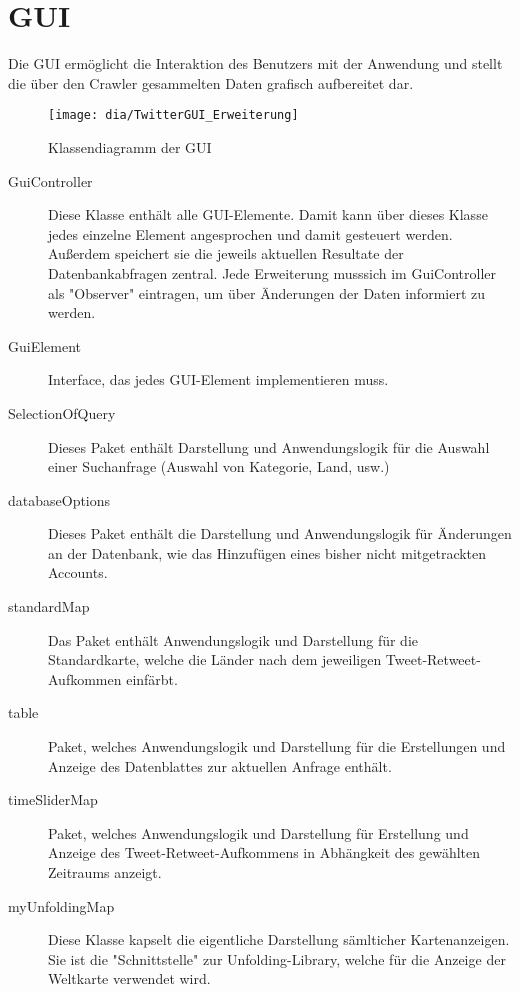 \section{GUI}
Die GUI ermöglicht die Interaktion des Benutzers mit der Anwendung und stellt die über den Crawler gesammelten Daten grafisch aufbereitet dar. 
\begin{figure}[h!]
	\centering
	\texttt{[image: dia/TwitterGUI\_Erweiterung]}
	\caption{Klassendiagramm der GUI}
	\label{fig:GUI}
\end{figure}
\begin{description}
	\item[GuiController] Diese Klasse enthält alle GUI-Elemente. Damit kann über dieses Klasse jedes einzelne Element angesprochen und damit gesteuert werden. Außerdem speichert sie die jeweils aktuellen Resultate der Datenbankabfragen zentral. Jede Erweiterung musssich im GuiController als "Observer" eintragen, um über Änderungen der Daten informiert zu werden. 
	\item[GuiElement] Interface, das jedes GUI-Element implementieren muss.
	\item [SelectionOfQuery] Dieses Paket enthält Darstellung und Anwendungslogik für die Auswahl einer Suchanfrage (Auswahl von Kategorie, Land, usw.)
	\item[databaseOptions] Dieses Paket enthält die Darstellung und Anwendungslogik für Änderungen an der Datenbank, wie das Hinzufügen eines bisher nicht mitgetrackten Accounts.
	
	\item [standardMap] Das Paket enthält Anwendungslogik und Darstellung für die Standardkarte, welche die Länder nach dem jeweiligen Tweet-Retweet-Aufkommen einfärbt.
	\item [table] Paket, welches Anwendungslogik und Darstellung für die Erstellungen und Anzeige des Datenblattes zur aktuellen Anfrage enthält.
	\item [timeSliderMap] Paket, welches Anwendungslogik und Darstellung für Erstellung und Anzeige des Tweet-Retweet-Aufkommens in Abhängkeit des gewählten Zeitraums anzeigt.
	\item [myUnfoldingMap] Diese Klasse kapselt die eigentliche Darstellung sämlticher Kartenanzeigen. Sie ist die "Schnittstelle" zur Unfolding-Library, welche für die Anzeige der Weltkarte verwendet wird.
\end{description}
